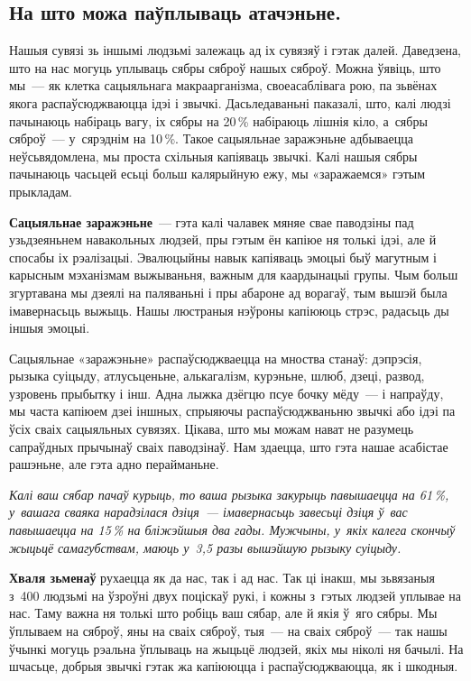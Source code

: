 \subsection*{На што можа паўплываць атачэньне.}

Нашыя сувязі зь іншымі людзьмі залежаць ад іх сувязяў і гэтак далей. Даведзена, што на нас могуць уплываць сябры сяброў нашых сяброў. Можна ўявіць, што мы~--- як клетка сацыяльнага макраарганізма, своеасаблівага рою, па зьвёнах якога распаўсюджваюцца ідэі і звычкі. Дасьледаваньні паказалі, што, калі людзі пачынаюць набіраць вагу, іх сябры на 20\,\% набіраюць лішнія кіло, а~сябры сяброў~--- у~сярэднім на 10\,\%. Такое сацыяльнае заражэньне адбываецца неўсьвядомлена, мы проста схільныя капіяваць звычкі. Калі нашыя сябры пачынаюць часьцей есьці больш калярыйную ежу, мы «заражаемся» гэтым прыкладам.

\textbf{Сацыяльнае заражэньне}~--- гэта калі чалавек мяняе свае паводзіны пад узьдзеяньнем навакольных людзей, пры гэтым ён капіюе ня толькі ідэі, але й спосабы іх рэалізацыі. Эвалюцыйны навык капіяваць эмоцыі быў магутным і карысным мэханізмам выжываньня, важным для каардынацыі групы. Чым больш згуртавана мы дзеялі на паляваньні і пры абароне ад ворагаў, тым вышэй была імавернасьць выжыць. Нашы люстраныя нэўроны капіююць стрэс, радасьць ды іншыя эмоцыі.


Сацыяльнае «заражэньне» распаўсюджваецца на мноства станаў: дэпрэсія, рызыка суіцыду, атлусьценьне, алькагалізм, курэньне, шлюб, дзеці, развод, узровень прыбытку і інш. Адна лыжка дзёгцю псуе бочку мёду~--- і напраўду, мы часта капіюем дзеі іншных, спрыяючы распаўсюджваньню звычкі або ідэі па ўсіх сваіх сацыяльных сувязях. Цікава, што мы можам нават не разумець сапраўдных прычынаў сваіх паводзінаў. Нам здаецца, што гэта нашае асабістае рашэньне, але гэта адно перайманьне.

\emph{Калі ваш сябар пачаў курыць, то ваша рызыка закурыць павышаецца на 61\,\%, у~вашага сваяка нарадзілася дзіця~--- імавернасьць завесьці дзіця ў~вас павышаецца на 15\,\% на бліжэйшыя два гады. Мужчыны, у~якіх калега скончыў жыцьцё самагубствам, маюць у~3,5 разы вышэйшую рызыку суіцыду.}

\textbf{Хваля зьменаў} рухаецца як да нас, так і ад нас. Так ці інакш, мы зьвязаныя з~400 людзьмі на ўзроўні двух поціскаў рукі, і кожны з~гэтых людзей уплывае на нас. Таму важна ня толькі што робіць ваш сябар, але й якія ў~яго сябры. Мы ўплываем на сяброў, яны на сваіх сяброў, тыя~--- на сваіх сяброў~--- так нашы ўчынкі могуць рэальна ўплываць на жыцьцё людзей, якіх мы ніколі ня бачылі. На шчасьце, добрыя звычкі гэтак жа капіююцца і распаўсюджваюцца, як і шкодныя.

